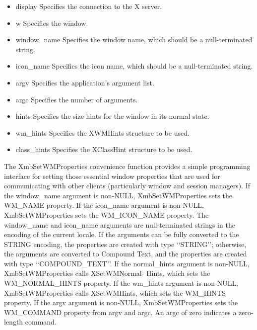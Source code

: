 \documentclass{report}
\begin{document}
\begin{itemize}
\begin{itemize}
\begin{cppcode}
            \end{cppcode}
            \bigbreak \noindent
            \begin{itemize}
                \item display Specifies the connection to the X server.
                \item w Specifies the window.
                \item window\_name Specifies the window name, which should be a null-terminated string.
                \item icon\_name Specifies the icon name, which should be a null-terminated string.
                \item argv Specifies the application’s argument list.
                \item argc Specifies the number of arguments.
                \item hints Specifies the size hints for the window in its normal state.
                \item wm\_hints Specifies the XWMHints structure to be used.
                \item class\_hints Specifies the XClassHint structure to be used.
            \end{itemize}
            The XmbSetWMProperties convenience function provides a simple programming interface for setting those essential window properties that are used for communicating with other clients (particularly window and session managers).
            \bigbreak \noindent 
            If the window\_name argument is non-NULL, XmbSetWMProperties sets the WM\_NAME property. If the icon\_name argument is non-NULL, XmbSetWMProperties sets the WM\_ICON\_NAME property. The window\_name and icon\_name arguments are null-terminated strings in the encoding of the current locale. If the arguments can be fully converted to the STRING encoding, the properties are created with type ‘‘STRING’’; otherwise, the arguments are converted to Compound Text, and the properties are created with type ‘‘COMPOUND\_TEXT’’.
            \bigbreak \noindent 
            If the normal\_hints argument is non-NULL, XmbSetWMProperties calls XSetWMNormal- Hints, which sets the WM\_NORMAL\_HINTS property. If the wm\_hints argument is non-NULL, XmbSetWMProperties calls XSetWMHints, which sets the WM\_HINTS property.
            \bigbreak \noindent 
            If the argv argument is non-NULL, XmbSetWMProperties sets the WM\_COMMAND property from argv and argc. An argc of zero indicates a zero-length command.
            \bigbreak \noindent 

\end{itemize}
\end{itemize}
\end{document}

